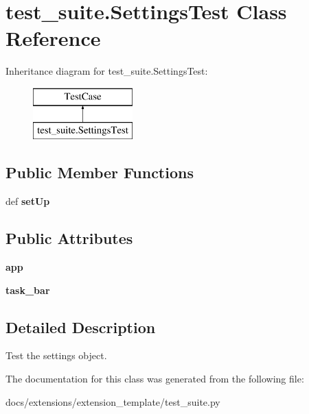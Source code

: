 \hypertarget{classtest__suite_1_1SettingsTest}{\section{test\+\_\+suite.\+Settings\+Test Class Reference}
\label{classtest__suite_1_1SettingsTest}
}
Inheritance diagram for test\+\_\+suite.\+Settings\+Test\+:\begin{figure}[H]
\begin{center}
\leavevmode
\includegraphics[height=2.000000cm]{classtest__suite_1_1SettingsTest}
\end{center}
\end{figure}
\subsection*{Public Member Functions}
\begin{DoxyCompactItemize}
\item 
\hypertarget{classtest__suite_1_1SettingsTest_aeaf8c43fc51455f8d8ab9d08dfc83fc2}{def {\bfseries set\+Up}}\label{classtest__suite_1_1SettingsTest_aeaf8c43fc51455f8d8ab9d08dfc83fc2}

\end{DoxyCompactItemize}
\subsection*{Public Attributes}
\begin{DoxyCompactItemize}
\item 
\hypertarget{classtest__suite_1_1SettingsTest_aa5ba18125ff41b7c4e906a92da7e47a0}{{\bfseries app}}\label{classtest__suite_1_1SettingsTest_aa5ba18125ff41b7c4e906a92da7e47a0}

\item 
\hypertarget{classtest__suite_1_1SettingsTest_acb4e8a196242a0a395d7777529de431c}{{\bfseries task\+\_\+bar}}\label{classtest__suite_1_1SettingsTest_acb4e8a196242a0a395d7777529de431c}

\end{DoxyCompactItemize}


\subsection{Detailed Description}
\begin{DoxyVerb}Test the settings object.
\end{DoxyVerb}
 

The documentation for this class was generated from the following file\+:\begin{DoxyCompactItemize}
\item 
docs/extensions/extension\+\_\+template/test\+\_\+suite.\+py\end{DoxyCompactItemize}
